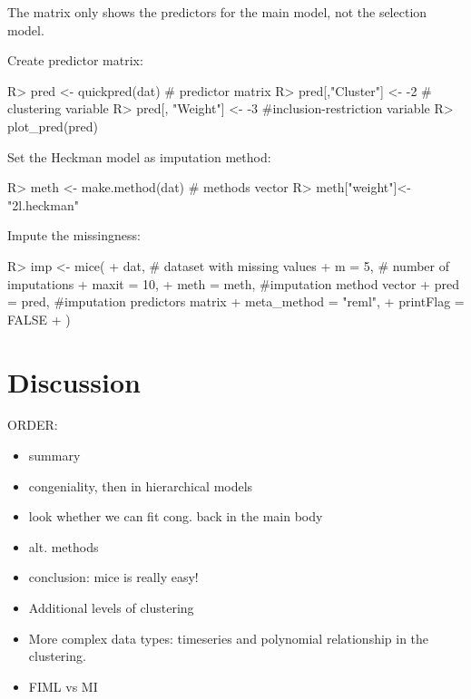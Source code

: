 \documentclass[
]{jss}
\begin{document}
The matrix only shows the predictors for the main model, not the
selection model.

Create predictor matrix:

\begin{CodeChunk}
\begin{CodeInput}
R> pred <- quickpred(dat)   # predictor matrix
R> pred[,"Cluster"] <- -2 # clustering variable
R> pred[, "Weight"] <- -3 #inclusion-restriction variable
R> plot_pred(pred)
\end{CodeInput}
\end{CodeChunk}

Set the Heckman model as imputation method:

\begin{CodeChunk}
\begin{CodeInput}
R> meth <- make.method(dat) # methods vector
R> meth["weight"]<-"2l.heckman"
\end{CodeInput}
\end{CodeChunk}

Impute the missingness:

\begin{CodeChunk}
\begin{CodeInput}
R> imp <- mice(
+   dat, # dataset with missing values
+   m = 5, # number of imputations
+   maxit = 10,
+   meth = meth, #imputation method vector
+   pred = pred, #imputation predictors matrix
+   meta_method = "reml",
+   printFlag = FALSE
+ )
\end{CodeInput}
\end{CodeChunk}

\hypertarget{discussion}{%
\section{Discussion}\label{discussion}}

ORDER:

\begin{itemize}
\item
  summary
\item
  congeniality, then in hierarchical models
\item
  look whether we can fit cong. back in the main body
\item
  alt. methods
\item
  conclusion: mice is really easy!
\item
  Additional levels of clustering
\item
  More complex data types: timeseries and polynomial relationship in the
  clustering.
\item
  FIML vs MI
\end{itemize}
\end{document}
